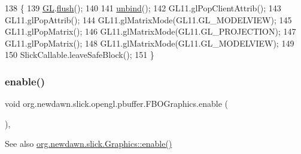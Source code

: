 \begin{DoxyCode}
138                              \{
139         \mbox{\hyperlink{classorg_1_1newdawn_1_1slick_1_1_graphics_a39ca68db81b225982a4421c4a6835eed}{GL}}.\mbox{\hyperlink{interfaceorg_1_1newdawn_1_1slick_1_1opengl_1_1renderer_1_1_s_g_l_a97c40969d74b57d2df86421d53b9c55c}{flush}}();
140         
141         \mbox{\hyperlink{classorg_1_1newdawn_1_1slick_1_1opengl_1_1pbuffer_1_1_f_b_o_graphics_a97b6e81e29ca7188a71d8a029d07befe}{unbind}}();
142         GL11.glPopClientAttrib();
143         GL11.glPopAttrib();
144         GL11.glMatrixMode(GL11.GL\_MODELVIEW);
145         GL11.glPopMatrix();
146         GL11.glMatrixMode(GL11.GL\_PROJECTION);
147         GL11.glPopMatrix();
148         GL11.glMatrixMode(GL11.GL\_MODELVIEW);
149         
150         SlickCallable.leaveSafeBlock();
151     \}
\end{DoxyCode}
\mbox{\label{classorg_1_1newdawn_1_1slick_1_1opengl_1_1pbuffer_1_1_f_b_o_graphics_a55575a64fc9c6fe2b955ad0a631ee767}} 
\subsubsection{\texorpdfstring{enable()}{enable()}}
{\footnotesize\ttfamily void org.\+newdawn.\+slick.\+opengl.\+pbuffer.\+F\+B\+O\+Graphics.\+enable (\begin{DoxyParamCaption}{ }\end{DoxyParamCaption})\hspace{0.3cm}{\ttfamily [inline]}, {\ttfamily [protected]}}

\begin{DoxySeeAlso}{See also}
\mbox{\hyperlink{classorg_1_1newdawn_1_1slick_1_1_graphics_a094766a3a763c402d5d077710b4d3fc5}{org.\+newdawn.\+slick.\+Graphics\+::enable()}} 
\end{DoxySeeAlso}

